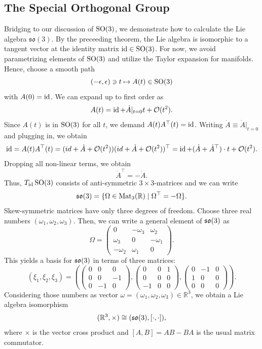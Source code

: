 \subsection{The Special Orthogonal Group}
\begin{eg}
    Bridging to our discussion of $\operatorname{SO}(3)$, we demonstrate how to calculate the Lie algebra $\mathfrak{s}\mathfrak{o}(3)$. By the preceeding theorem, the Lie algebra is isomorphic to a tangent vector at the identity matrix $\operatorname{id} \in \operatorname{SO}(3)$. For now, we avoid parametrizing elements of $\operatorname{SO}(3)$ and utilize the Taylor expansion for manifolds. Hence, choose a smooth path \[
        (-\epsilon, \epsilon) \ni t \mapsto A(t) \in \operatorname{SO}(3)
    \] with $A(0)=\operatorname{id}$. We can expand up to first order as
    \[
        A(t) = \operatorname{id} + \dot{A}|_{t=0} t + \mathcal{O}(t^2)
    .\] Since $A(t)$ is in $\operatorname{SO}(3)$ for all $t$, we demand $A(t)A^\top (t)=\operatorname{id}$. Writing $\dot{A} \equiv \dot{A}|_{t=0}$ and plugging in, we obtain
\[
    \operatorname{id} = A(t)A^\top (t) = (id+\dot{A}+\mathcal{O}(t^2))(id + \dot{A}+\mathcal{O}(t^2))^\top = \operatorname{id} + (\dot{A} + \dot{A}^\top) \cdot t + \mathcal{O}(t^2)
.\] Dropping all non-linear terms, we obtain \[
\dot{A}^\top= - \dot{A}
.\] Thus, $T_{\operatorname{id}}\operatorname{SO}(3)$ consists of anti-symmetric $3 \times 3$-matrices and we can write
\[
\mathfrak{s}\mathfrak{o}(3)=\{\Omega \in \operatorname{Mat}_3(\mathbb{R}) \mid \Omega^\top = - \Omega \} 
.\] Skew-symmetric matrices have only three degrees of freedom. Choose three real numbers $(\omega_1,\omega_2, \omega_3)$. Then, we can write a general element of $\operatorname{\mathfrak{s}\mathfrak{o}}(3)$ as
\[
    \Omega = \begin{pmatrix} 0 &- \omega_3 & \omega_2 \\ \omega_3 & 0 & - \omega_1 \\ - \omega_2 & \omega_1 & 0  \end{pmatrix}
.\] This yields a basis for $\operatorname{\mathfrak{s}\mathfrak{o}}(3)$ in terms of three matrices:
\[
    (\xi_1, \xi_2, \xi_3) = \left( \begin{pmatrix} 0&0&0\\ 0&0&-1\\ 0&-1&0 \end{pmatrix}, \begin{pmatrix} 0&0&1\\ 0&0&0\\ -1&0&0 \end{pmatrix}, \begin{pmatrix} 0&-1&0\\ 1&0&0\\ 0&0&0 \end{pmatrix} \right)
.\] Considering those numbers as vector $\omega = (\omega_1, \omega_2, \omega_3) \in \mathbb{R}^3$, we obtain a Lie algebra isomorphism
\[
    (\mathbb{R}^3, \times) \cong (\operatorname{\mathfrak{s}\mathfrak{o}}(3), [\cdot, \cdot])
,\] where $\times$ is the vector cross product and $[A,B]=AB-BA$ is the usual matrix commutator.
\end{eg}
